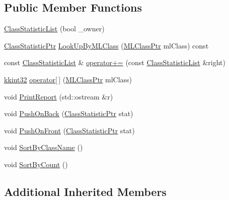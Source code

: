 \subsection*{Public Member Functions}
\begin{DoxyCompactItemize}
\item 
\hyperlink{class_k_k_m_l_l_1_1_class_statistic_list_abdfc8dd3d19a828e10fed6287064a8ff}{Class\+Statistic\+List} (bool \+\_\+owner)
\item 
\hyperlink{namespace_k_k_m_l_l_a85182174e5ae7ba508dad118983b37bc}{Class\+Statistic\+Ptr} \hyperlink{class_k_k_m_l_l_1_1_class_statistic_list_a92c17f198e44dde73699e953960ee565}{Look\+Up\+By\+M\+L\+Class} (\hyperlink{namespace_k_k_m_l_l_ac272393853d59e72e8456f14cd6d8c23}{M\+L\+Class\+Ptr} ml\+Class) const 
\item 
const \hyperlink{class_k_k_m_l_l_1_1_class_statistic_list}{Class\+Statistic\+List} \& \hyperlink{class_k_k_m_l_l_1_1_class_statistic_list_af7bf8f9199c11f1d4e4de121c9d338c8}{operator+=} (const \hyperlink{class_k_k_m_l_l_1_1_class_statistic_list}{Class\+Statistic\+List} \&right)
\item 
\hyperlink{namespace_k_k_b_a8fa4952cc84fda1de4bec1fbdd8d5b1b}{kkint32} \hyperlink{class_k_k_m_l_l_1_1_class_statistic_list_af472242ee127fc90a2eaf347909a4ab9}{operator\mbox{[}$\,$\mbox{]}} (\hyperlink{namespace_k_k_m_l_l_ac272393853d59e72e8456f14cd6d8c23}{M\+L\+Class\+Ptr} ml\+Class)
\item 
void \hyperlink{class_k_k_m_l_l_1_1_class_statistic_list_a36be525aa8ea62ec533accb98cb8cb8c}{Print\+Report} (std\+::ostream \&r)
\item 
void \hyperlink{class_k_k_m_l_l_1_1_class_statistic_list_a393f72df56041290214cab3915309ebc}{Push\+On\+Back} (\hyperlink{namespace_k_k_m_l_l_a85182174e5ae7ba508dad118983b37bc}{Class\+Statistic\+Ptr} stat)
\item 
void \hyperlink{class_k_k_m_l_l_1_1_class_statistic_list_a21a844c851ce0da51d3d4780bb04db3c}{Push\+On\+Front} (\hyperlink{namespace_k_k_m_l_l_a85182174e5ae7ba508dad118983b37bc}{Class\+Statistic\+Ptr} stat)
\item 
void \hyperlink{class_k_k_m_l_l_1_1_class_statistic_list_a547a74b085d01e12fb9c3bf7f7f36c07}{Sort\+By\+Class\+Name} ()
\item 
void \hyperlink{class_k_k_m_l_l_1_1_class_statistic_list_a76ffb0b82be002e15f235d2edc0733b9}{Sort\+By\+Count} ()
\end{DoxyCompactItemize}
\subsection*{Additional Inherited Members}


